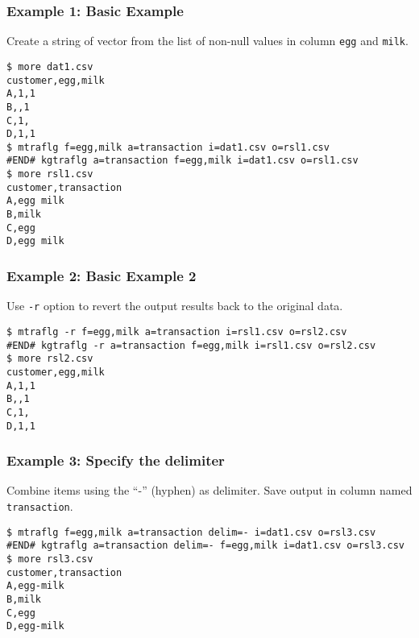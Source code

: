 \subsubsection*{Example 1: Basic Example}

Create a string of vector from the list of non-null values in column \verb|egg| and \verb|milk|.


\begin{Verbatim}[baselinestretch=0.7,frame=single]
$ more dat1.csv
customer,egg,milk
A,1,1
B,,1
C,1,
D,1,1
$ mtraflg f=egg,milk a=transaction i=dat1.csv o=rsl1.csv
#END# kgtraflg a=transaction f=egg,milk i=dat1.csv o=rsl1.csv
$ more rsl1.csv
customer,transaction
A,egg milk
B,milk
C,egg
D,egg milk
\end{Verbatim}
\subsubsection*{Example 2: Basic Example 2}

Use \verb|-r| option to revert the output results back to the original data.


\begin{Verbatim}[baselinestretch=0.7,frame=single]
$ mtraflg -r f=egg,milk a=transaction i=rsl1.csv o=rsl2.csv
#END# kgtraflg -r a=transaction f=egg,milk i=rsl1.csv o=rsl2.csv
$ more rsl2.csv
customer,egg,milk
A,1,1
B,,1
C,1,
D,1,1
\end{Verbatim}
\subsubsection*{Example 3: Specify the delimiter}

Combine items using the “-” (hyphen) as delimiter. Save output in column named \verb|transaction|.


\begin{Verbatim}[baselinestretch=0.7,frame=single]
$ mtraflg f=egg,milk a=transaction delim=- i=dat1.csv o=rsl3.csv
#END# kgtraflg a=transaction delim=- f=egg,milk i=dat1.csv o=rsl3.csv
$ more rsl3.csv
customer,transaction
A,egg-milk
B,milk
C,egg
D,egg-milk
\end{Verbatim}
